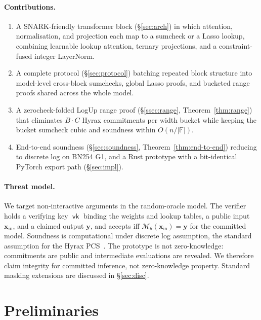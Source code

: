 \documentclass[letterpaper,twocolumn,10pt]{article}
\theoremstyle{remark}
\theoremstyle{definition}
\newcommand{\FF}{\mathbb{F}}
\newcommand{\bx}{\mathbf{x}}
\newcommand{\by}{\mathbf{y}}
\newcommand{\calM}{\mathcal{M}}
\DeclareMathOperator{\popvk}{\mathsf{vk}}
\begin{document}
\paragraph{Contributions.}
\begin{enumerate}
  \item A SNARK-friendly transformer block
        (\S\ref{sec:arch}) in which attention, normalisation, and
        projection each map to a sumcheck or a Lasso lookup, combining
        learnable lookup attention, ternary projections, and a
        constraint-fused integer LayerNorm.
  \item A complete protocol (\S\ref{sec:protocol}) batching repeated
        block structure into model-level cross-block sumchecks,
        global Lasso proofs, and bucketed range proofs shared across
        the whole model.
  \item A zerocheck-folded LogUp range proof (\S\ref{ssec:range},
        Theorem~\ref{thm:range}) that eliminates $B\cdot C$
        Hyrax commitments per width bucket while keeping the
        bucket sumcheck cubic and soundness within $O(n/|\FF|)$.
  \item End-to-end soundness (\S\ref{sec:soundness},
        Theorem~\ref{thm:end-to-end}) reducing to discrete log on
        BN254 G1, and a Rust prototype with a bit-identical PyTorch
        export path (\S\ref{sec:impl}).
\end{enumerate}

\paragraph{Threat model.}
We target non-interactive arguments in the random-oracle model. The
verifier holds a verifying key
$\popvk$ binding the weights and lookup tables, a public input
$\bx_{\mathrm{in}}$, and a claimed output $\by$, and accepts iff
$\calM_\theta(\bx_{\mathrm{in}})\!=\!\by$ for the committed model.
Soundness is computational under discrete log assumption, the
standard assumption for the Hyrax PCS~\cite{wahby2018doubly}. The
prototype is not zero-knowledge: commitments are public and
intermediate evaluations are revealed. We therefore claim integrity
for committed inference, not zero-knowledge property.
Standard masking extensions are discussed in \S\ref{sec:disc}.

\section{Preliminaries}
\label{sec:bg}
\end{document}
